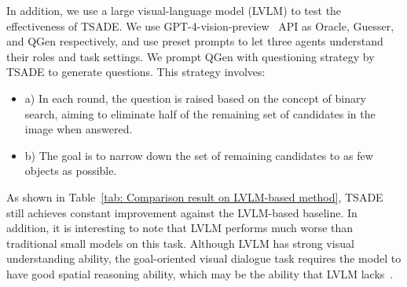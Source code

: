 
In addition, we use a large visual-language model (LVLM) to test the effectiveness of TSADE.
We use GPT-4-vision-preview~\cite{yang2023dawn} API as Oracle, Guesser, and QGen respectively, and use preset prompts to let three agents understand their roles and task settings. 
We prompt QGen with questioning strategy by TSADE to generate questions. This strategy involves:
\begin{itemize}
    \item a) In each round, the question is raised based on the concept of binary search, aiming to eliminate half of the remaining set of candidates in the image when answered.
    \item b) The goal is to narrow down the set of remaining candidates to as few objects as possible.
\end{itemize}
As shown in Table~\ref{tab: Comparison result on LVLM-based method}, TSADE still achieves constant improvement against the LVLM-based baseline. 
In addition, it is interesting to note that LVLM performs much worse than traditional small models on this task. Although LVLM has strong visual understanding ability, the goal-oriented visual dialogue task requires the model to have good spatial reasoning ability, which may be the ability that LVLM lacks~\cite{kamath2023s}.




